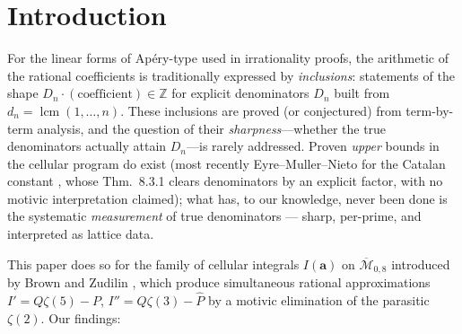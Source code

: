 \documentclass[11pt]{article}
\theoremstyle{definition}
\newcommand{\dn}[1]{d_{#1}}
\newcommand{\Z}{\mathbb{Z}}
\begin{document}
\section{Introduction}

For the linear forms of Ap\'ery-type used in irrationality proofs, the
arithmetic of the rational coefficients is traditionally expressed by
\emph{inclusions}: statements of the shape $D_n\cdot(\text{coefficient})
\in\Z$ for explicit denominators $D_n$ built from $\dn{n}=
\operatorname{lcm}(1,\dots,n)$. These inclusions are proved (or
conjectured) from term-by-term analysis, and the question of their
\emph{sharpness}---whether the true denominators actually attain
$D_n$---is rarely addressed. Proven \emph{upper} bounds in the cellular
program do exist (most recently Eyre--Muller--Nieto for the Catalan
constant \cite{EMN}, whose Thm.~8.3.1 clears denominators by an explicit
factor, with no motivic interpretation claimed); what has, to our
knowledge, never been done is the systematic \emph{measurement} of true
denominators --- sharp, per-prime, and interpreted as lattice data.

This paper does so for the family of cellular integrals
$I(\mathbf{a})$ on $\overline{\mathcal M}_{0,8}$ introduced by Brown and
Zudilin \cite{BZ}, which produce simultaneous rational approximations
$I'=Q\zeta(5)-P$, $I''=Q\zeta(3)-\hat P$ by a motivic elimination of the
parasitic $\zeta(2)$. Our findings:
\end{document}
